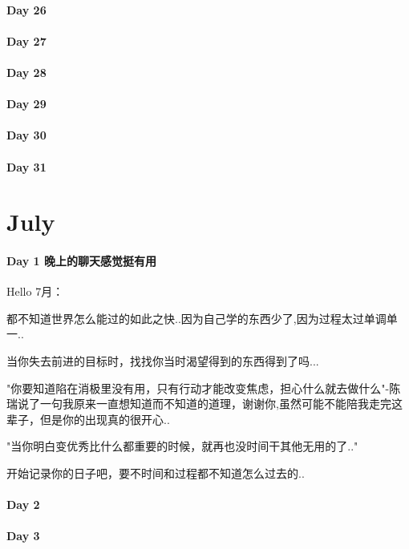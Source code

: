 \documentclass[UTF8,a4paper,8pt]{ctexbook}
\begin{document}
 	 \paragraph{Day 26      \quad     }
 	 \paragraph{Day 27      \quad     }
 	 \paragraph{Day 28      \quad     }
 	 \paragraph{Day 29      \quad     }   
 	 \paragraph{Day 30      \quad     }
 	 \paragraph{Day 31      \quad     }
 \section*{July}
 	 \paragraph{Day 1   晚上的聊天感觉挺有用    \quad     }
	 	 Hello 7月：
	 	 
	 	 都不知道世界怎么能过的如此之快..因为自己学的东西少了,因为过程太过单调单一..
	 	 
	 	 当你失去前进的目标时，找找你当时渴望得到的东西得到了吗...
	 	 
	 	 "你要知道陷在消极里没有用，只有行动才能改变焦虑，担心什么就去做什么"-陈瑞说了一句我原来一直想知道而不知道的道理，谢谢你,虽然可能不能陪我走完这辈子，但是你的出现真的很开心..
	 	 
	 	 "当你明白变优秀比什么都重要的时候，就再也没时间干其他无用的了.."
	 	 
	 	 开始记录你的日子吧，要不时间和过程都不知道怎么过去的..	 
 	 \paragraph{Day 2       \quad     }
 	 \paragraph{Day 3       \quad     }
\end{document}
